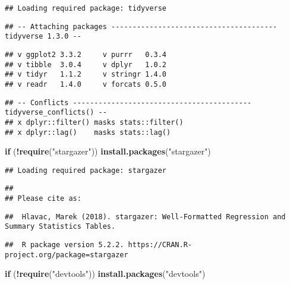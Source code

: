 \documentclass[
]{book}
\newenvironment{Shaded}{\begin{snugshade}}{\end{snugshade}}
\newcommand{\ControlFlowTok}[1]{\textcolor[rgb]{0.13,0.29,0.53}{\textbf{#1}}}
\newcommand{\KeywordTok}[1]{\textcolor[rgb]{0.13,0.29,0.53}{\textbf{#1}}}
\newcommand{\NormalTok}[1]{#1}
\newcommand{\OperatorTok}[1]{\textcolor[rgb]{0.81,0.36,0.00}{\textbf{#1}}}
\newcommand{\StringTok}[1]{\textcolor[rgb]{0.31,0.60,0.02}{#1}}
\begin{document}
\begin{verbatim}
## Loading required package: tidyverse
\end{verbatim}

\begin{verbatim}
## -- Attaching packages --------------------------------------- tidyverse 1.3.0 --
\end{verbatim}

\begin{verbatim}
## v ggplot2 3.3.2     v purrr   0.3.4
## v tibble  3.0.4     v dplyr   1.0.2
## v tidyr   1.1.2     v stringr 1.4.0
## v readr   1.4.0     v forcats 0.5.0
\end{verbatim}

\begin{verbatim}
## -- Conflicts ------------------------------------------ tidyverse_conflicts() --
## x dplyr::filter() masks stats::filter()
## x dplyr::lag()    masks stats::lag()
\end{verbatim}

\begin{Shaded}
\begin{Highlighting}[]
\ControlFlowTok{if}\NormalTok{ (}\OperatorTok{!}\KeywordTok{require}\NormalTok{(}\StringTok{"stargazer"}\NormalTok{)) }\KeywordTok{install.packages}\NormalTok{(}\StringTok{"stargazer"}\NormalTok{)}
\end{Highlighting}
\end{Shaded}

\begin{verbatim}
## Loading required package: stargazer
\end{verbatim}

\begin{verbatim}
## 
## Please cite as:
\end{verbatim}

\begin{verbatim}
##  Hlavac, Marek (2018). stargazer: Well-Formatted Regression and Summary Statistics Tables.
\end{verbatim}

\begin{verbatim}
##  R package version 5.2.2. https://CRAN.R-project.org/package=stargazer
\end{verbatim}

\begin{Shaded}
\begin{Highlighting}[]
\ControlFlowTok{if}\NormalTok{ (}\OperatorTok{!}\KeywordTok{require}\NormalTok{(}\StringTok{"devtools"}\NormalTok{)) }\KeywordTok{install.packages}\NormalTok{(}\StringTok{"devtools"}\NormalTok{)}
\end{Highlighting}
\end{Shaded}
\end{document}

